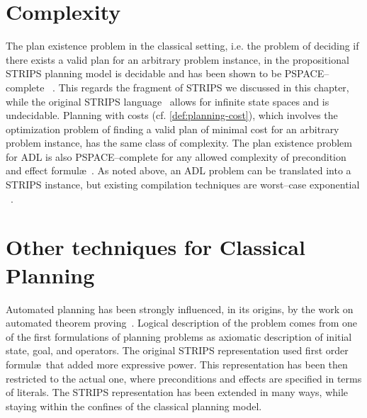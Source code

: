 \section{Complexity}

The plan existence problem in the classical setting, i.e. the problem of deciding if there
exists a valid plan for an arbitrary problem instance, in the
propositional STRIPS planning model is decidable and has been shown to
be PSPACE--complete \ \citep{bylander:complexity}. This regards the
fragment of STRIPS we discussed in this chapter, while the original
STRIPS language~\citep{bylander:complexity} allows for infinite state
spaces and is undecidable.  Planning with costs
(cf. \autoref{def:planning-cost}), which involves the
optimization problem of finding a valid plan of minimal cost for an
arbitrary problem instance, has the same class of complexity.  The
plan existence problem for ADL is also PSPACE--complete for any
allowed complexity of precondition and effect
formul\ae~\citep{baier:thesis}.  As noted above, an ADL problem can be
translated into a STRIPS instance, but existing compilation techniques
are worst--case exponential \ \citep{gazen:adl}.

\section{Other techniques for Classical Planning}
\label{sec:beyond}

Automated planning has been strongly influenced, in its origins, by the work on automated theorem proving~\citep{green:theorem}.
Logical description of the problem comes from one of the first formulations of planning problems as
 axiomatic description of initial state, goal, and operators.
The original STRIPS representation used first order formul\ae~that added more expressive power. This representation has been then
restricted to the actual one, where preconditions and effects are specified in terms of literals.
%
%
The STRIPS representation has been extended in many ways, while staying within
the confines of the classical planning model. %
%

